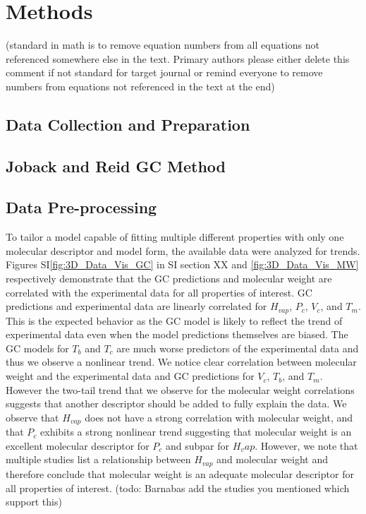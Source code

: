 \documentclass[journal=jacsat,manuscript=article]{achemso}
\newcommand{\alltodo}[1]{{\color{cyan} (#1)}}
\begin{document}
\section{Methods}
\alltodo{standard in math is to remove equation numbers from all equations not referenced somewhere else in the text. Primary authors please either delete this comment if not standard for target journal or remind everyone to remove numbers from equations not referenced in the text at the end}
\subsection{Data Collection and Preparation}
\subsection{Joback and Reid GC Method}
\subsection{Data Pre-processing} \label{sec:preprocess}
To tailor a model capable of fitting multiple different properties with only one molecular descriptor and model form, the available data were analyzed for trends. Figures SI\ref{fig:3D_Data_Vis_GC} in SI section XX and \ref{fig:3D_Data_Vis_MW} respectively demonstrate that the GC predictions and molecular weight are correlated with the experimental data for all properties of interest. GC predictions and experimental data are linearly correlated for $H_{vap}$, $P_c$, $V_c$, and $T_m$. This is the expected behavior as the GC model is likely to reflect the trend of experimental data even when the model predictions themselves are biased. The GC models for $T_b$ and $T_c$ are much worse predictors of the experimental data and thus we observe a nonlinear trend. We notice clear correlation between molecular weight and the experimental data and GC predictions for $V_c$, $T_b$, and $T_m$. However the two-tail trend that we observe for the molecular weight correlations suggests that another descriptor should be added to fully explain the data. We observe that $H_{vap}$ does not have a strong correlation with molecular weight, and that $P_c$ exhibits a strong nonlinear trend suggesting that molecular weight is an excellent molecular descriptor for $P_c$ and subpar for $H_vap$. However, we note that multiple studies list a relationship between $H_{vap}$ and molecular weight and therefore conclude that molecular weight is an adequate molecular descriptor for all properties of interest. (todo: Barnabas add the studies you mentioned which support this)
\end{document}
